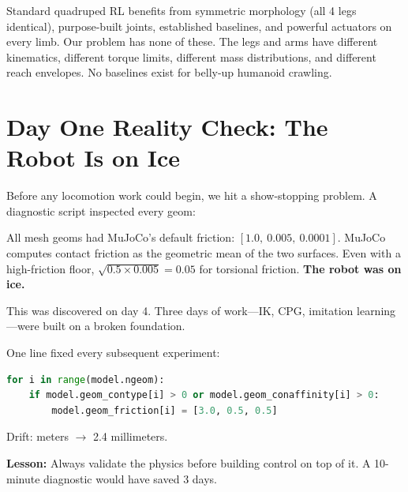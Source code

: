 \documentclass[11pt, a4paper]{article}
\begin{document}
Standard quadruped RL benefits from symmetric morphology (all 4 legs identical), purpose-built joints, established baselines, and powerful actuators on every limb. Our problem has none of these. The legs and arms have different kinematics, different torque limits, different mass distributions, and different reach envelopes. No baselines exist for belly-up humanoid crawling.


\section{Day One Reality Check: The Robot Is on Ice}
\label{sec:sliding}

Before any locomotion work could begin, we hit a show-stopping problem. A diagnostic script inspected every geom:

\begin{failbox}
All mesh geoms had MuJoCo's default friction: $[1.0,\ 0.005,\ 0.0001]$. MuJoCo computes contact friction as the geometric mean of the two surfaces. Even with a high-friction floor, $\sqrt{0.5 \times 0.005} = 0.05$ for torsional friction. \textbf{The robot was on ice.}

This was discovered on day 4. Three days of work---IK, CPG, imitation learning---were built on a broken foundation.
\end{failbox}

\begin{fixbox}
One line fixed every subsequent experiment:
\begin{lstlisting}[language=Python]
for i in range(model.ngeom):
    if model.geom_contype[i] > 0 or model.geom_conaffinity[i] > 0:
        model.geom_friction[i] = [3.0, 0.5, 0.5]
\end{lstlisting}
Drift: meters $\rightarrow$ 2.4 millimeters.
\end{fixbox}

\begin{insightbox}
\textbf{Lesson:} Always validate the physics before building control on top of it. A 10-minute diagnostic would have saved 3 days.
\end{insightbox}
\end{document}

